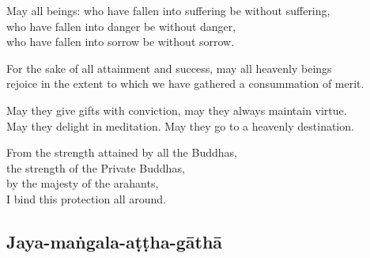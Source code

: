 
May all beings: who have fallen into suffering be without suffering,\\
who have fallen into danger be without danger,\\
who have fallen into sorrow be without sorrow.

For the sake of all attainment and success, may all heavenly beings\\
rejoice in the extent to which we have gathered a consummation of merit.

May they give gifts with conviction, may they always maintain virtue.\\
May they delight in meditation. May they go to a heavenly destination.

From the strength attained by all the Buddhas,\\
the strength of the Private Buddhas,\\
by the majesty of the arahants,\\
I bind this protection all around.

\subsection{Jaya-maṅgala-aṭṭha-gāthā}
\label{bahum}


